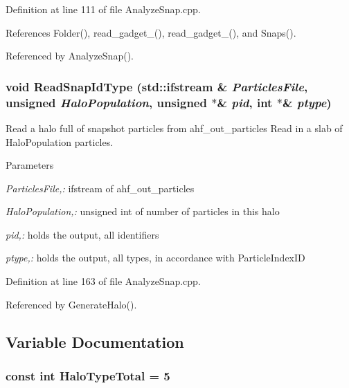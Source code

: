 Definition at line 111 of file AnalyzeSnap.cpp.



References Folder(), read\_\-gadget\_(), read\_\-gadget\_(), and Snaps().



Referenced by AnalyzeSnap().

\subsubsection[{ReadSnapIdType}]{\setlength{\rightskip}{0pt plus 5cm}void ReadSnapIdType (std::ifstream \& {\em ParticlesFile}, \/  unsigned {\em HaloPopulation}, \/  unsigned $\ast$\& {\em pid}, \/  int $\ast$\& {\em ptype})}\label{AnalyzeSnap_8cpp_a4c813ec7d70ddf16a008d578b587b2e4}


Read a halo full of snapshot particles from ahf\_\-out\_\-particles Read in a slab of HaloPopulation particles. 


\begin{DoxyParams}{Parameters}
\item[{\em ParticlesFile,:}]ifstream of ahf\_\-out\_\-particles \item[{\em HaloPopulation,:}]unsigned int of number of particles in this halo \item[{\em pid,:}]holds the output, all identifiers \item[{\em ptype,:}]holds the output, all types, in accordance with ParticleIndexID \end{DoxyParams}


Definition at line 163 of file AnalyzeSnap.cpp.



Referenced by GenerateHalo().



\subsection{Variable Documentation}
\subsubsection[{HaloTypeTotal}]{\setlength{\rightskip}{0pt plus 5cm}const int {\bf HaloTypeTotal} = 5}\label{AnalyzeSnap_8cpp_a8473fa3d28febd7487db0967e19fc5bf}


